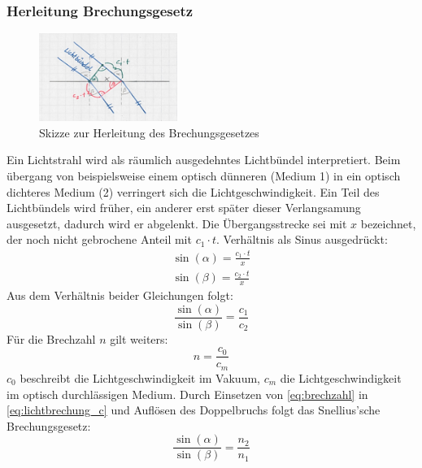 \documentclass[a4paper, 11pt, ngerman, parskip=half-]{scrartcl}
\begin{document}
\subsubsection*{Herleitung Brechungsgesetz}
%
\begin{figure}[H]
    \centering
    \begin{samepage}
        \includegraphics[width=0.4\textwidth]{image/15/brechungsgesetz.jpg}
        \caption{Skizze zur Herleitung des Brechungsgesetzes}
        \label{fig:brechungsgesetz}
    \end{samepage}
\end{figure}
%
Ein Lichtstrahl wird als räumlich ausgedehntes Lichtbündel interpretiert. Beim übergang von beispielsweise einem optisch dünneren (Medium 1) in ein optisch dichteres Medium (2) verringert sich die Lichtgeschwindigkeit. Ein Teil des Lichtbündels wird früher, ein anderer erst später dieser Verlangsamung ausgesetzt, dadurch wird er abgelenkt. Die Übergangsstrecke sei mit $x$ bezeichnet, der noch nicht gebrochene Anteil mit $c_1 \cdot t$. Verhältnis als Sinus ausgedrückt:
%
\begin{equation}
    \begin{split}
        \sin(\alpha) = \frac{c_1 \cdot t}{x} \\
        \sin(\beta) = \frac{c_2 \cdot t}{x}
    \end{split}
\end{equation}
%
Aus dem Verhältnis beider Gleichungen folgt:
\begin{equation}
    \label{eq:lichtbrechung_c}
    \frac{\sin(\alpha)}{\sin(\beta)} = \frac{c_1}{c_2}
\end{equation}
%
Für die Brechzahl $n$ gilt weiters:
\begin{equation}
    \label{eq:brechzahl}
    n = \frac{c_0}{c_m}
\end{equation}
%
$c_0$ beschreibt die Lichtgeschwindigkeit im Vakuum, $c_m$ die Lichtgeschwindigkeit im optisch durchlässigen Medium. Durch Einsetzen von \autoref{eq:brechzahl} in \autoref{eq:lichtbrechung_c} und Auflösen des Doppelbruchs folgt das Snellius'sche Brechungsgesetz:
%
\begin{equation}
    \label{eq:brechungsgesetz_n}
    \frac{\sin(\alpha)}{\sin(\beta)} = \frac{n_2}{n_1}
\end{equation}
\end{document}

